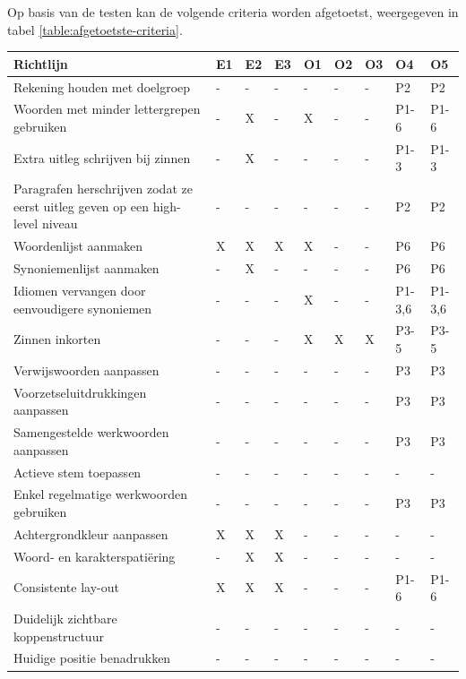 \medspace

Op basis van de testen kan de volgende criteria worden afgetoetst, weergegeven in tabel \ref{table:afgetoetste-criteria}.

\begin{table}[H]
	\centering
\begin{tabular}{ | m{8cm} | m{0.5cm} | m{0.5cm} | m{0.5cm} | m{0.5cm} | m{0.5cm} | m{0.5cm} | m{1cm} | m{1cm} | }
		\hline
		Richtlijn & E1 & E2 & E3 & O1 & O2 & O3 & O4 & O5 \\ \hline
		Rekening houden met doelgroep & - & - & - & - & - & - & P2 & P2 \\ \hline
		Woorden met minder lettergrepen gebruiken & - & X & - & X & - & - & P1-6 & P1-6 \\ \hline
		Extra uitleg schrijven bij zinnen & - & X & - & - & - & - & P1-3 & P1-3 \\ \hline
		Paragrafen herschrijven zodat ze eerst uitleg geven op een high-level niveau & - & - & - & - & - & - & P2 & P2 \\ \hline
		Woordenlijst aanmaken & X & X & X & X & - & - & P6 & P6 \\ \hline
		Synoniemenlijst aanmaken & - & X & - & - & - & - & P6 & P6 \\ \hline
		Idiomen vervangen door eenvoudigere synoniemen & - & - & - & X & - & - & P1-3,6 & P1-3,6 \\ \hline
		Zinnen inkorten & - & - & - & X & X & X & P3-5 & P3-5 \\ \hline
		Verwijswoorden aanpassen & - & - & - & - & - & - & P3 & P3 \\ \hline
		Voorzetseluitdrukkingen aanpassen & - & - & - & - & - & - & P3 & P3 \\ \hline
		Samengestelde werkwoorden aanpassen & - & - & - & - & - & - & P3 & P3 \\ \hline
		Actieve stem toepassen & - & - & - & - & - & - & - & - \\ \hline
		Enkel regelmatige werkwoorden gebruiken & - & - & - & - & - & - & P3 & P3 \\ \hline
		Achtergrondkleur aanpassen & X & X & X & - & - & - & - & - \\ \hline
		Woord- en karakterspatiëring & - & X & X & - & - & - & - & - \\ \hline
		Consistente lay-out & X & X & X & - & - & - & P1-6 & P1-6 \\ \hline
		Duidelijk zichtbare koppenstructuur & - & - & - & - & - & - & - & - \\ \hline
		Huidige positie benadrukken & - & - & - & - & - & - & - & - \\ \hline

\end{tabular}
\end{table}
